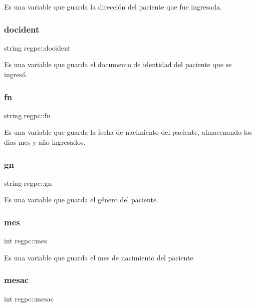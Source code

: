 Es una variable que guarda la dirección del paciente que fue ingresada. \mbox{\label{classregpc_a7b918d9a415903d63944d3ef17e48c3d}} 
\subsubsection{\texorpdfstring{docident}{docident}}
{\footnotesize\ttfamily string regpc\+::docident}

Es una variable que guarda el documento de identidad del paciente que se ingresó. \mbox{\label{classregpc_a0db133a320356ff6a456cee7f2d34720}} 
\subsubsection{\texorpdfstring{fn}{fn}}
{\footnotesize\ttfamily string regpc\+::fn}

Es una variable que guarda la fecha de nacimiento del paciente, almacenando los dias mes y año ingresados. \mbox{\label{classregpc_ad7cee8fe68a32c50e6de8c621e3c61bc}} 
\subsubsection{\texorpdfstring{gn}{gn}}
{\footnotesize\ttfamily string regpc\+::gn}

Es una variable que guarda el género del paciente. \mbox{\label{classregpc_a4b33b5752a60e0e6223d6204a9001457}} 
\subsubsection{\texorpdfstring{mes}{mes}}
{\footnotesize\ttfamily int regpc\+::mes}

Es una variable que guarda el mes de nacimiento del paciente. \mbox{\label{classregpc_a769fa5789fc163701f43fbcd7e30dd68}} 
\subsubsection{\texorpdfstring{mesac}{mesac}}
{\footnotesize\ttfamily int regpc\+::mesac}

